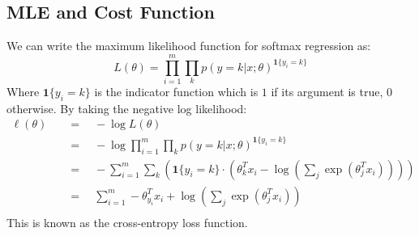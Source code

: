 \documentclass[twoside,twocolumn]{article}
\begin{document}
\subsection{MLE and Cost Function}
We can write the maximum likelihood function for softmax regression as:
\begin{equation}
  L(\theta) = \prod_{i=1}^m \prod_k p(y=k|x; \theta)^{\mathbf{1}\{y_i=k\}}
\end{equation}
Where $\mathbf{1} \{y_i=k\}$ is the indicator function which is $1$ if its
argument is true, $0$ otherwise.
By taking the negative log likelihood:
\begin{equation}
  \begin{aligned}
    \ell ( \theta ) \quad & = \quad -\log L ( \theta ) \\
    & = \quad - \log \prod_{i=1}^m \prod_k p(y=k|x; \theta)^{\mathbf{1}\{y_i=k\}} \\
    & = \quad -\sum_{i=1}^m \sum_k \left( \mathbf{1}\{y_i=k\} \cdot \left( \theta^T_k x_i - \log \left( \sum_j \exp \left( \theta_j^T x_i \right) \right) \right) \right) \\
    & = \quad \sum_{i=1}^m -\theta^T_{y_i} x_i + \log \left( \sum_j \exp \left( \theta_j^T x_i \right) \right) \\
  \end{aligned}
\end{equation}
This is known as the cross-entropy loss function.
\end{document}
